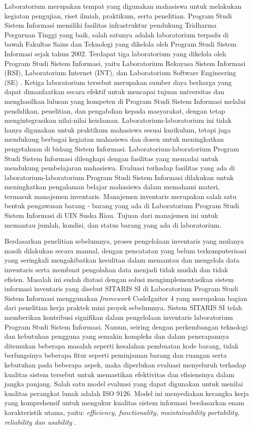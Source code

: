 Laboratorium merupakan tempat yang digunakan mahasiswa untuk melakukan kegiatan pengujian, riset ilmiah, praktikum, serta penelitian. Program Studi Sistem Informasi memiliki fasilitas infrastruktur pendukung Tridharma Perguruan Tinggi yang baik, salah satunya adalah laboratorium terpadu di bawah Fakultas Sains dan Teknologi yang dikelola oleh Program Studi Sistem Informasi sejak tahun 2002. Terdapat tiga laboratorium yang dikelola oleh Program Studi Sistem Informasi, yaitu Laboratorium Rekayasa Sistem Informasi (RSI), Laboratorium Internet (INT), dan Laboratorium Software Engineering (SE) \cite{lab-si-website}. Ketiga laboratorium tersebut merupakan sumber daya berharga yang dapat dimanfaatkan secara efektif untuk mencapai tujuan universitas dan menghasilkan lulusan yang kompeten di Program Studi Sistem Informasi melalui pendidikan, penelitian, dan pengabdian kepada masyarakat, dengan tetap mengintegrasikan nilai-nilai keislaman. Laboratorium-laboratorium ini tidak hanya digunakan untuk praktikum mahasiswa sesuai kurikulum, tetapi juga mendukung berbagai kegiatan mahasiswa dan dosen untuk meningkatkan pengetahuan di bidang Sistem Informasi. Laboratorium-laboratorium Program Studi Sistem Informasi dilengkapi dengan fasilitas yang memadai untuk mendukung pembelajaran mahasiswa. Evaluasi terhadap fasilitas yang ada di laboratorium-laboratorium Program Studi Sistem Informasi dilakukan untuk meningkatkan pengalaman belajar mahasiswa dalam memahami materi, termasuk manajemen inventaris. Manajemen inventaris merupakan salah satu bentuk pengawasan barang - barang yang ada di Laboratorium Program Studi Sistem Informasi di UIN Suska Riau. Tujuan dari manajemen ini untuk memantau jumlah, kondisi, dan status barang yang ada di laboratorium. 

Berdasarkan penelitian sebelumnya, proses pengelolaan inventaris yang mulanya masih dilakukan secara manual, dengan pencatatan yang belum terkomputerisasi yang seringkali mengakibatkan kesulitan dalam memantau dan mengelola data inventaris serta membuat pengolahan data menjadi tidak mudah dan tidak efisien. Masalah ini sudah diatasi dengan solusi mengimplementasikan sistem informasi inventaris yang disebut SITARIS SI di Laboratorium Program Studi Sistem Informasi menggunakan \textit{framework} CodeIgniter 4 yang merupakan bagian dari penelitian kerja praktek mini proyek sebelumnya. Sistem SITARIS SI telah memberikan kontribusi signifikan dalam pengelolaan inventaris laboratorium Program Studi Sistem Informasi. Namun, seiring dengan perkembangan teknologi dan kebutuhan pengguna yang semakin kompleks dan dalam penerapannya ditemukan beberapa masalah seperti kesalahan pembuatan kode barang, tidak berfungsinya beberapa fitur seperti peminjaman barang dan ruangan serta kebutuhan pada beberapa aspek, maka diperlukan evaluasi menyeluruh terhadap kualitas sistem tersebut untuk memastikan efektivitas dan efisiensinya dalam jangka panjang. Salah satu model evaluasi yang dapat digunakan untuk menilai kualitas perangkat lunak adalah ISO 9126. Model ini menyediakan kerangka kerja yang komprehensif untuk mengukur kualitas sistem informasi berdasarkan enam karakteristik utama, yaitu: \textit{efficiency, functionality, maintainability portability, reliability dan usability} \cite{iso2001iec}.

